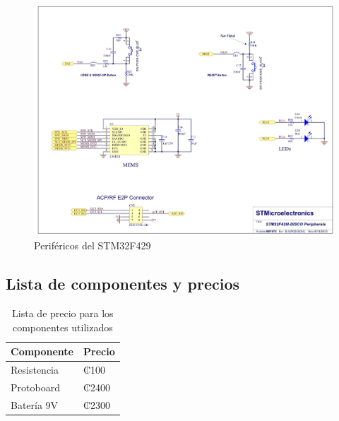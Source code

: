    \begin{figure}[H]
        \centering
        \includegraphics[width=0.65\linewidth]{fotos/perifericos.jpeg}
        \caption{Periféricos del STM32F429}
        \label{peripherals}
    \end{figure}



\subsection{Lista de componentes y precios}

\begin{table}[H]
\centering
\begin{tabular}{|l|l|}
\hline
Componente & Precio \\ \hline
Resistencia & ₡100 \\ \hline
Protoboard & ₡2400  \\ \hline
Batería 9V & ₡2300 \\ \hline
\end{tabular}
\caption{Lista de precio para los componentes utilizados}
\label{precios}
\end{table}



